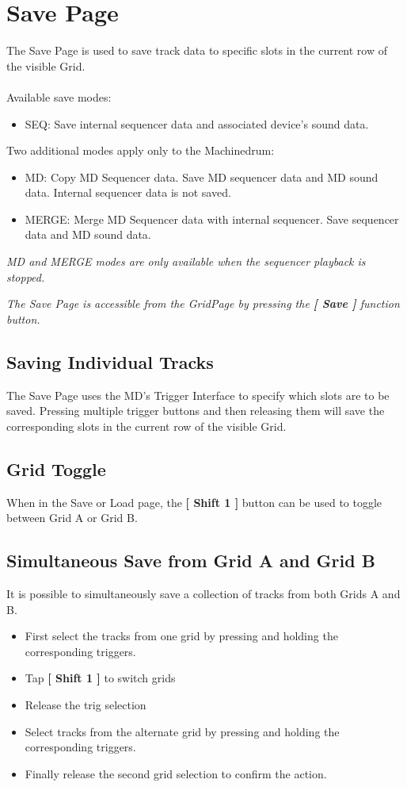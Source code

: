 \chapter{Save Page}

The Save Page is used to save track data to specific slots in the current row of the visible  Grid.\\
\\
Available save modes:
\begin{itemize}
    \item SEQ: Save internal sequencer data and associated device's sound data.
\end{itemize}
Two additional modes apply only to the Machinedrum:
\begin{itemize}
    \item MD: Copy MD Sequencer data. Save MD sequencer data and MD sound data. Internal sequencer data is not saved.
    \item MERGE: Merge MD Sequencer data with internal sequencer. Save sequencer data and MD sound data.
\end{itemize}
\textit{MD and MERGE modes are only available when the sequencer playback is stopped.}
\\



\textit{The Save Page is accessible from the GridPage by pressing the  \textbf{[ Save ]} function button.}


\section{Saving Individual Tracks}
The Save Page uses the MD's Trigger Interface to specify which slots are to be saved. Pressing multiple trigger buttons and then releasing them will save the corresponding slots in the current row of the visible Grid.
\section{Grid Toggle}
When in the Save or Load page, the \textbf{[ Shift 1 ]} button can be used to toggle between Grid A or Grid B.
\section{Simultaneous Save from Grid A and Grid B}
It is possible to simultaneously save a collection of tracks from both Grids A and B. 
\begin{itemize}
\item First select the tracks from one grid by pressing and holding the corresponding triggers.
\item Tap \textbf{[ Shift 1 ]} to switch grids
\item Release the trig selection
\item Select tracks from the alternate grid by pressing and holding the corresponding triggers. 
\item Finally release the second grid selection to confirm the action. 
\end{itemize}

